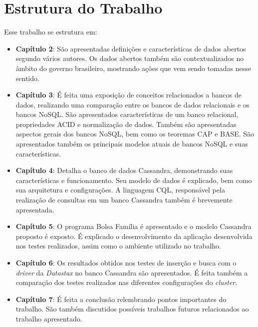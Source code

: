 \section{Estrutura do Trabalho}
Esse trabalho se estrutura em:
\begin{itemize}
\item \textbf{Capítulo 2}: São apresentadas definições e características de dados abertos segundo vários autores. Os dados abertos também são contextualizados no âmbito do governo brasileiro, mostrando ações que vem sendo tomadas nesse sentido.
\item \textbf{Capítulo 3}: É feita uma exposição de conceitos relacionados a bancos de dados, realizando uma comparação entre os bancos de dados relacionais e os bancos NoSQL. São apresentados características de um banco relacional, propriedades ACID e normalização de dados. Também são apresentadas aspectos gerais dos bancos NoSQL, bem como os teoremas CAP e BASE. São apresentados também os principais modelos atuais de bancos NoSQL e suas características.
\item \textbf{Capítulo 4}: Detalha o banco de dados Cassandra, demonstrando suas características e funcionamento. Seu modelo de dados é explicado, bem como sua arquitetura e configurações. A linguagem CQL, responsável pela realização de consultas em um banco Cassandra também é brevemente apresentada.
\item \textbf{Capítulo 5}: O programa Bolsa Família é apresentado e o modelo Cassandra proposto é exposto. É explicado o desenvolvimento da aplicação desenvolvida nos testes realizados, assim como o ambiente utilizado no trabalho.
\item \textbf{Capítulo 6}: Os resultados obtidos nos testes de inserção e busca com o \emph{driver} da \emph{Datastax} no banco Cassandra são apresentados. É feita também a comparação dos testes realizados nas diferentes configurações do \emph{cluster}.
\item \textbf{Capítulo 7}: É feita a conclusão relembrando pontos importantes do trabalho. São também discutidos possíveis trabalhos futuros relacionados ao trabalho apresentado.
\end{itemize}




